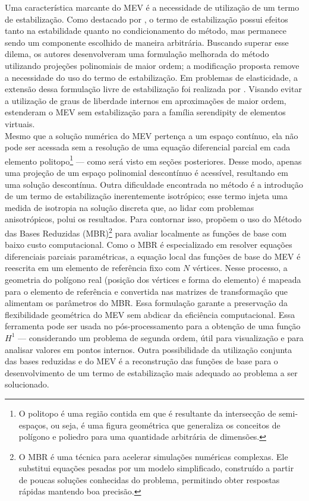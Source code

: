 \indent Uma característica marcante do MEV é a necessidade de utilização de um termo de estabilização. Como destacado por \citet{lowestorderstabilizationfreevirtualelementmethod2dpoissonequation2025}, o termo de estabilização possui efeitos tanto na estabilidade quanto no condicionamento do método, mas permanece sendo um componente escolhido de maneira arbitrária. Buscando superar esse dilema, os autores desenvolveram uma formulação melhorada do método utilizando projeções polinomiais de maior ordem; a modificação proposta remove a necessidade do uso do termo de estabilização. Em problemas de elasticidade, a extensão dessa formulação livre de estabilização foi realizada por \citet{lowestorderstabilizationfreevirtualelementmethod2dpoissonequation2025}. Visando evitar a utilização de graus de liberdade internos em aproximações de maior ordem, \citet{stabilizationfreeserendipityvirtualelementmethodplaneelasticity2023} estenderam o MEV sem estabilização para a família serendipity de elementos virtuais. \\
\indent Mesmo que a solução numérica do MEV pertença a um espaço contínuo, ela não pode ser acessada sem a resolução de uma equação diferencial parcial em cada elemento politopo\footnote{O politopo é uma região contida em que é resultante da intersecção de semi-espaços, ou seja, é uma figura geométrica que generaliza os conceitos de polígono e poliedro para uma quantidade arbitrária de dimensões.} — como será visto em seções posteriores. Desse modo, apenas uma projeção de um espaço polinomial descontínuo é acessível, resultando em uma solução descontínua. Outra dificuldade encontrada no método é a introdução de um termo de estabilização inerentemente isotrópico; esse termo injeta uma medida de isotropia na solução discreta que, ao lidar com problemas anisotrópicos, polui os resultados. Para contornar isso, \citet{reducedbasisstabilizationpostprocessingvirtualelementmethod2024a} propõem o uso do Método das Bases Reduzidas (MBR)\footnote{O MBR é uma técnica para acelerar simulações numéricas complexas. Ele substitui equações pesadas por um modelo simplificado, construído a partir de poucas soluções conhecidas do problema, permitindo obter respostas rápidas mantendo boa precisão.} para avaliar localmente as funções de base com baixo custo computacional. Como o MBR é especializado em resolver equações diferenciais parciais paramétricas, a equação local das funções de base do MEV é reescrita em um elemento de referência fixo com $N$ vértices. Nesse processo, a geometria do polígono real (posição dos vértices e forma do elemento) é mapeada para o elemento de referência e convertida nas matrizes de transformação que alimentam os parâmetros do MBR. Essa formulação garante a preservação da flexibilidade geométrica do MEV sem abdicar da eficiência computacional. Essa ferramenta pode ser usada no pós-processamento para a obtenção de uma função $H^1$ — considerando um problema de segunda ordem, útil para visualização e para analisar valores em pontos internos. Outra possibilidade da utilização conjunta das bases reduzidas e do MEV é a reconstrução das funções de base para o desenvolvimento de um termo de estabilização mais adequado ao problema a ser solucionado.  \\
